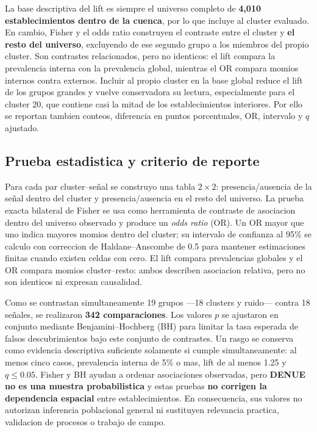 \documentclass[11pt,letterpaper]{article}
\begin{document}
La base descriptiva del lift es siempre el universo completo de \textbf{4,010 establecimientos dentro de la cuenca}, por lo que incluye al cluster evaluado. En cambio, Fisher y el odds ratio construyen el contraste entre el cluster y \textbf{el resto del universo}, excluyendo de ese segundo grupo a los miembros del propio cluster. Son contrastes relacionados, pero no identicos: el lift compara la prevalencia interna con la prevalencia global, mientras el OR compara momios internos contra externos. Incluir al propio cluster en la base global reduce el lift de los grupos grandes y vuelve conservadora su lectura, especialmente para el cluster 20, que contiene casi la mitad de los establecimientos interiores. Por ello se reportan tambien conteos, diferencia en puntos porcentuales, OR, intervalo y $q$ ajustado.

\subsection{Prueba estadistica y criterio de reporte}

Para cada par cluster--señal se construyo una tabla $2\times2$: presencia/ausencia de la señal dentro del cluster y presencia/ausencia en el resto del universo. La prueba exacta bilateral de Fisher se usa como herramienta de contraste de asociacion dentro del universo observado y produce un \emph{odds ratio} (OR). Un OR mayor que uno indica mayores momios dentro del cluster; su intervalo de confianza al 95\% se calculo con correccion de Haldane--Anscombe de 0.5 para mantener estimaciones finitas cuando existen celdas con cero. El lift compara prevalencias globales y el OR compara momios cluster--resto: ambos describen asociacion relativa, pero no son identicos ni expresan causalidad.

Como se contrastan simultaneamente 19 grupos ---18 clusters y ruido--- contra 18 señales, se realizaron \textbf{342 comparaciones}. Los valores $p$ se ajustaron en conjunto mediante Benjamini--Hochberg (BH) para limitar la tasa esperada de falsos descubrimientos bajo este conjunto de contrastes. Un rasgo se conserva como evidencia descriptiva suficiente solamente si cumple simultaneamente: al menos cinco casos, prevalencia interna de 5\% o mas, lift de al menos 1.25 y $q\leq0.05$. Fisher y BH ayudan a ordenar asociaciones observadas, pero \textbf{DENUE no es una muestra probabilistica} y estas pruebas \textbf{no corrigen la dependencia espacial} entre establecimientos. En consecuencia, sus valores no autorizan inferencia poblacional general ni sustituyen relevancia practica, validacion de procesos o trabajo de campo.
\end{document}
